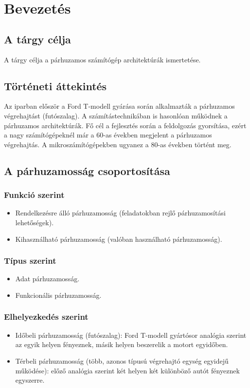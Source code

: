 
\chapter{Bevezetés}

\section{A tárgy célja}
A tárgy célja a párhuzamos számítógép architektúrák ismertetése.

\section{Történeti áttekintés}
Az iparban először a Ford T-modell gyárása során alkalmazták a párhuzamos végrehajtást (futószalag).
A számítástechnikában is hasonlóan működnek a párhuzamos architektúrák.
Fő cél a fejlesztés során a feldolgozás gyorsítása, ezért a nagy számítógépeknél már a 60-as években megjelent a párhuzamos végrehajtás.
A mikroszámítógépekben ugyanez a 80-as években történt meg.

\section{A párhuzamosság csoportosítása}

\subsection{Funkció szerint}
\begin{itemize}
    \item Rendelkezésre álló párhuzamosság (feladatokban rejlő párhuzamosítási lehetőségek).
    \item Kihasználható párhuzamosság (valóban használható párhuzamosság).
\end{itemize}

\subsection{Típus szerint}
\begin{itemize}
    \item Adat párhuzamosság.
    \item Funkcionális párhuzamosság.
\end{itemize}

\subsection{Elhelyezkedés szerint}
\begin{itemize}
    \item Időbeli párhuzamosság (futószalag): Ford T-modell gyártósor analógia szerint az egyik helyen fényeznek, másik helyen beszerelik a motort egyidőben.
    \item Térbeli párhuzamosság (több, azonos típusú végrehajtó egység egyidejű működése): előző analógia szerint két helyen két különböző autót fényeznek egyszerre.
\end{itemize}

